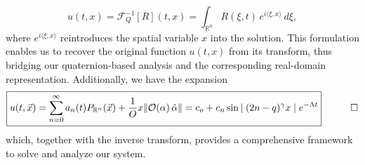 \documentclass{article}
\begin{document}
\[
u(t,x) = \mathcal{F}_Q^{-1}[R](t,x) = \int_{\mathbb{R}^n} R(\xi,t) \, e^{i \langle \xi, x \rangle} \, d\xi,
\]
where \( e^{i \langle \xi, x \rangle} \) reintroduces the spatial variable \( x \) into the solution. This formulation enables us to recover the original function \( u(t,x) \) from its transform, thus bridging our quaternion-based analysis and the corresponding real-domain representation. Additionally, we have the expansion
\[
\boxed {u(t, \vec x) = \sum_{n=0}^{\infty} a_n(t) P_{\mathbb{R}^{n}}(\vec x) + \frac{1}{O} x\|\mathcal{O}(\alpha)\,\hat{\alpha}\| = c_{o} + c_{n}\sin{\mid (2n-q)^{\gamma}x \mid e^{-\Lambda t}}}  \quad \qed
\]
which, together with the inverse transform, provides a comprehensive framework to solve and analyze our system.
\end{document}
